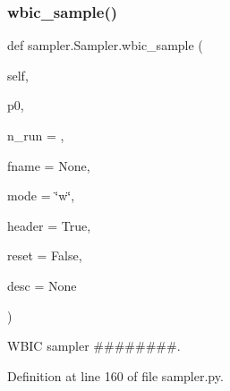 \subsubsection{\texorpdfstring{wbic\+\_\+sample()}{wbic\_sample()}}
{\footnotesize\ttfamily def sampler.\+Sampler.\+wbic\+\_\+sample (\begin{DoxyParamCaption}\item[{}]{self,  }\item[{}]{p0,  }\item[{}]{n\+\_\+run = {},  }\item[{}]{fname = {\ttfamily None},  }\item[{}]{mode = {\ttfamily \char`\"{}w\char`\"{}},  }\item[{}]{header = {\ttfamily True},  }\item[{}]{reset = {\ttfamily False},  }\item[{}]{desc = {\ttfamily None} }\end{DoxyParamCaption})}



W\+B\+IC sampler \#\#\#\#\#\#\#\#. 



Definition at line 160 of file sampler.\+py.


